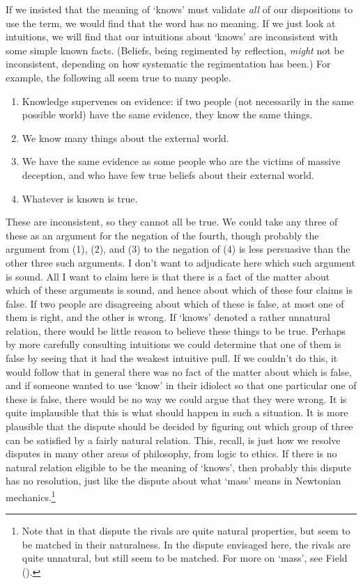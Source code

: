 \documentclass[
  10pt,
  letterpaper,
  DIV=11,
  numbers=noendperiod,
  twoside]{scrartcl}
\providecommand{\tightlist}{%
  \setlength{\itemsep}{0pt}\setlength{\parskip}{0pt}}\usepackage{longtable,booktabs,array}
\begin{document}
If we insisted that the meaning of `knows' must validate \emph{all} of
our dispositions to use the term, we would find that the word has no
meaning. If we just look at intuitions, we will find that our intuitions
about `knows' are inconsistent with some simple known facts. (Beliefs,
being regimented by reflection, \emph{might} not be inconsistent,
depending on how systematic the regimentation has been.) For example,
the following all seem true to many people.

\begin{enumerate}
\def\labelenumi{\arabic{enumi}.}
\tightlist
\item
  Knowledge supervenes on evidence: if two people (not necessarily in
  the same possible world) have the same evidence, they know the same
  things.
\item
  We know many things about the external world.
\item
  We have the same evidence as some people who are the victims of
  massive deception, and who have few true beliefs about their external
  world.
\item
  Whatever is known is true.
\end{enumerate}

These are inconsistent, so they cannot all be true. We could take any
three of these as an argument for the negation of the fourth, though
probably the argument from (1), (2), and (3) to the negation of (4) is
less persuasive than the other three such arguments. I don't want to
adjudicate here which such argument is sound. All I want to claim here
is that there is a fact of the matter about which of these arguments is
sound, and hence about which of these four claims is false. If two
people are disagreeing about which of these is false, at most one of
them is right, and the other is wrong. If `knows' denoted a rather
unnatural relation, there would be little reason to believe these things
to be true. Perhaps by more carefully consulting intuitions we could
determine that one of them is false by seeing that it had the weakest
intuitive pull. If we couldn't do this, it would follow that in general
there was no fact of the matter about which is false, and if someone
wanted to use `know' in their idiolect so that one particular one of
these is false, there would be no way we could argue that they were
wrong. It is quite implausible that this is what should happen in such a
situation. It is more plausible that the dispute should be decided by
figuring out which group of three can be satisfied by a fairly natural
relation. This, recall, is just how we resolve disputes in many other
areas of philosophy, from logic to ethics. If there is no natural
relation eligible to be the meaning of `knows', then probably this
dispute has no resolution, just like the dispute about what `mass' means
in Newtonian mechanics.\footnote{Note that in that dispute the rivals
  are quite natural properties, but seem to be matched in their
  naturalness. In the dispute envisaged here, the rivals are quite
  unnatural, but still seem to be matched. For more on `mass', see Field
  ().}
\end{document}
